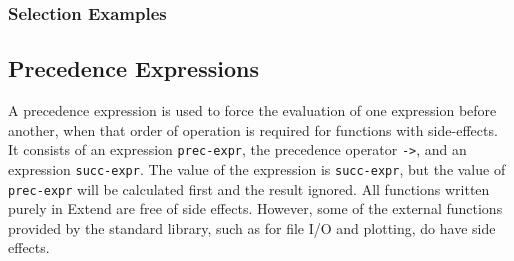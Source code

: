 \subsubsection{Selection Examples}

\subsection{Precedence Expressions}
A precedence expression is used to force the evaluation of one expression before another, when that order of operation is required for functions with side-effects. It consists of an expression \texttt{prec-expr}, the precedence operator \texttt{->}, and an expression \texttt{succ-expr}. The value of the expression is \texttt{succ-expr}, but the value of \texttt{prec-expr} will be calculated first and the result ignored. All functions written purely in Extend are free of side effects. However, some of the external functions provided by the standard library, such as for file I/O and plotting, do have side effects.
